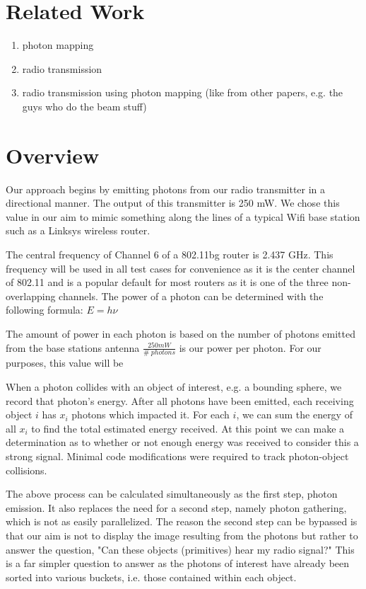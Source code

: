 \documentclass[%
        final,
        notitlepage,
        narroweqnarray,
        inline,
        twoside,
        ]{ieee}
\begin{document}
\section{Related Work}

\begin{enumerate}
\item photon mapping

\item radio transmission

\item radio transmission using photon mapping (like from other papers, e.g. the
guys who do the beam stuff)
\end{enumerate}

\section{Overview}
Our approach begins by emitting photons from our radio transmitter in a
directional manner.  The output of this transmitter is 250 mW.  We chose this
value in our aim to mimic something along the lines of a typical Wifi base
station such as a Linksys wireless router. 

The central frequency of Channel 6 of a 802.11b\/g router is 2.437 GHz. This frequency
will be used in all test cases for convenience as it is the center channel of 802.11 and
is a popular default for most routers as it is one of the three non-overlapping channels. 
The power of a photon can be determined with the following formula: $E = h\nu$



The amount of power in each photon is based on the number of photons emitted from the base stations
antenna
$\frac{250mW}{\#\;photons}$ is our power per photon.  For our purposes, this
value will be

When a photon collides with an object of interest, e.g. a bounding sphere, we
record that photon's energy.  After all photons have been emitted, each 
receiving object $i$ has $x_i$ photons which impacted it.  For each $i$, we
can sum the energy of all $x_i$ to find the total estimated energy received.
At this point we can make a determination as to whether or not enough energy
was received to consider this a strong signal.  Minimal code modifications
were required to track photon-object collisions.

The above process can be calculated simultaneously as the first step, photon
emission.  It also replaces the need for a second step, namely photon
gathering, which is not as easily parallelized.  The reason the second step can
be bypassed is that our aim is not to display the image resulting from the
photons but rather to answer the question, "Can these objects (primitives) hear
my radio signal?"  This is a far simpler question to answer as the photons of
interest have already been sorted into various buckets, i.e. those contained
within each object.
\end{document}
